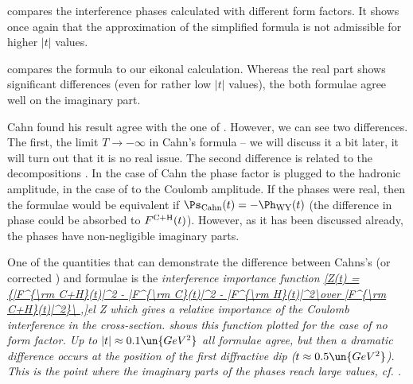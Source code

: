  compares the interference phases calculated with different form factors. It shows once again that the approximation of the simplified \WaY{} formula is not admissible for higher $|t|$ values.

 compares the \KL{} formula to our eikonal calculation. Whereas the real part shows significant differences (even for rather low $|t|$ values), the both formulae agree well on the imaginary part.





Cahn found his result  agree with the one of \WY{} . However, we can see two differences. The first, the limit $T\to -\infty$ in Cahn's formula -- we will discuss it a bit later, it will turn out that it is no real issue. The second difference is related to the decompositions . In the case of Cahn the phase factor is plugged to the hadronic amplitude, in the case of \WaY{} to the Coulomb amplitude. If the phases were real, then the formulae would be equivalent if $\Ps_{\rm Cahn}(t) = - \Ph_{\rm WY}(t)$ (the difference in phase could be absorbed to $F^{\rm C+H}(t)$). However, as it has been discussed already, the phases have non-negligible imaginary parts.

One of the quantities that can demonstrate the difference between Cahns's (or corrected \KL) and \WY{} formulae is the \em{interference importance} function
\eqref{Z(t) = {|F^{\rm C+H}(t)|^2 - |F^{\rm C}(t)|^2 - |F^{\rm H}(t)|^2\over |F^{\rm C+H}(t)|^2}\ ,}{el Z}
which gives a relative importance of the Coulomb interference in the cross-section.  shows this function plotted for the case of no form factor. Up to $|t| \approx 0.1\un{GeV^2}$ all formulae agree, but then a dramatic difference occurs at the position of the first diffractive dip ($t\approx 0.5\un{GeV^2}$). This is the point where the imaginary parts of the phases reach large values, cf. .

